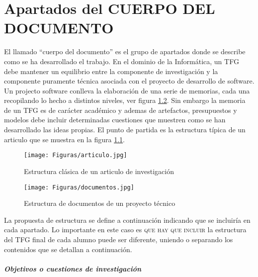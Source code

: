 
 \chapter{Apartados del CUERPO DEL DOCUMENTO}

El llamado ``cuerpo del documento'' es el grupo de apartados donde se describe como  se ha desarrollado el trabajo. En el dominio de la Informática, un TFG debe mantener un equilibrio entre la componente de investigación y la componente puramente técnica asociada con el proyecto de desarrollo de software. Un projecto software conlleva la elaboración de una serie de memorias, cada una recopilando lo hecho a distintos niveles, ver figura \ref{fig:report}. Sin embargo la memoria de un TFG es de carácter académico y ademas de artefactos, presupuestos y modelos debe incluir determinadas cuestiones que muestren como se han desarrollado las ideas propias. El punto de partida es la estructura típica de un articulo que se muestra en la figura \ref{fig:articulo}.

\begin{figure}
	\begin{center}
		\texttt{[image: Figuras/articulo.jpg]}
	\end{center}
	\caption{Estructura clásica de un articulo de investigación}
	\label{fig:articulo}
\end{figure}



\begin{figure}  
 	\begin{center}
        \texttt{[image: Figuras/documentos.jpg]}
        	\end{center}
        \caption{Estructura de documentos de un proyecto técnico}
    \label{fig:report}
\end{figure}



La propuesta de estructura se define a continuación indicando que se incluiría en cada apartado. Lo importante en este caso es \textsc{que hay que incluir} la estructura del TFG final de cada alumno puede ser diferente, uniendo o separando los contenidos que se detallan a continuación. 

\paragraph{Objetivos o cuestiones de investigación}

